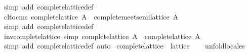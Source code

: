 \begin{isabellebody}
\ {}simp\ add{}\ complete{}lattice{}def{}%
\endisatagproof
{\isafoldproof}%
%
\isadelimproof
\isanewline
%
\endisadelimproof
\isanewline
{}\isamarkupfalse%
\ cl{}to{}cms{}\ {}complete{}lattice\ A\ {}\ complete{}meet{}semilattice\ A{}\isanewline
%
\isadelimproof
\ \ %
\endisadelimproof
%
\isatagproof
{}\isamarkupfalse%
\ {}simp\ add{}\ complete{}lattice{}def{}%
\endisatagproof
{\isafoldproof}%
%
\isadelimproof
\isanewline
%
\endisadelimproof
\isanewline
{}\isamarkupfalse%
\ inv{}complete{}lattice\ {}simp{}{}\ {}complete{}lattice\ {}A{}{}\ {}\ complete{}lattice\ A{}\isanewline
%
\isadelimproof
\ \ %
\endisadelimproof
%
\isatagproof
{}\isamarkupfalse%
\ {}simp\ add{}\ complete{}lattice{}def{}\ auto{}%
\endisatagproof
{\isafoldproof}%
%
\isadelimproof
\isanewline
%
\endisadelimproof
\isanewline
{}\isamarkupfalse%
\ complete{}lattice\ {}\ lattice\isanewline
%
\isadelimproof
\ \ %
\endisadelimproof
%
\isatagproof
{}\isamarkupfalse%
\ unfold{}locales%
\endisatagproof
{\isafoldproof}%
%
\isadelimproof
\isanewline
%
\endisadelimproof

\end{isabellebody}

